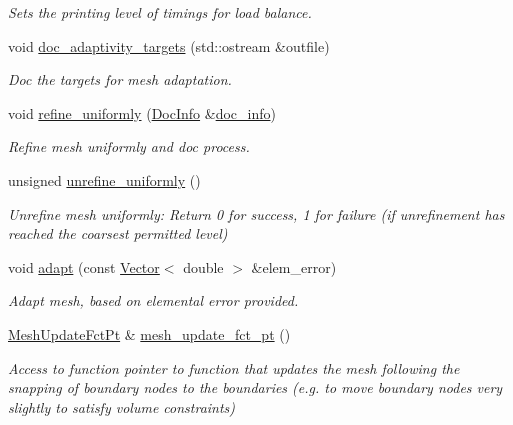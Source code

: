 \begin{DoxyCompactItemize}
\begin{DoxyCompactList}\small\item\em Sets the printing level of timings for load balance. \end{DoxyCompactList}\item 
void \hyperlink{classoomph_1_1RefineableTriangleMesh_a8b04c27cba8938936f73d90e00d70b22}{doc\+\_\+adaptivity\+\_\+targets} (std\+::ostream \&outfile)
\begin{DoxyCompactList}\small\item\em Doc the targets for mesh adaptation. \end{DoxyCompactList}\item 
void \hyperlink{classoomph_1_1RefineableTriangleMesh_a4820744f95d69328dfa4185fff21dd7b}{refine\+\_\+uniformly} (\hyperlink{classoomph_1_1DocInfo}{Doc\+Info} \&\hyperlink{classoomph_1_1RefineableMeshBase_a266f8b2a1499cc2ae7b24b19813923ee}{doc\+\_\+info})
\begin{DoxyCompactList}\small\item\em Refine mesh uniformly and doc process. \end{DoxyCompactList}\item 
unsigned \hyperlink{classoomph_1_1RefineableTriangleMesh_ae52c6aea299625c683522f00a89ff33d}{unrefine\+\_\+uniformly} ()
\begin{DoxyCompactList}\small\item\em Unrefine mesh uniformly\+: Return 0 for success, 1 for failure (if unrefinement has reached the coarsest permitted level) \end{DoxyCompactList}\item 
void \hyperlink{classoomph_1_1RefineableTriangleMesh_affc156d32aa40f84479e223f1217ebed}{adapt} (const \hyperlink{classoomph_1_1Vector}{Vector}$<$ double $>$ \&elem\+\_\+error)
\begin{DoxyCompactList}\small\item\em Adapt mesh, based on elemental error provided. \end{DoxyCompactList}\item 
\hyperlink{classoomph_1_1RefineableTriangleMesh_aa78ffa56b66a1371aec25e25f7aaff9e}{Mesh\+Update\+Fct\+Pt} \& \hyperlink{classoomph_1_1RefineableTriangleMesh_a09e932b9b9b3a42616524dd3fcb35fd3}{mesh\+\_\+update\+\_\+fct\+\_\+pt} ()
\begin{DoxyCompactList}\small\item\em Access to function pointer to function that updates the mesh following the snapping of boundary nodes to the boundaries (e.\+g. to move boundary nodes very slightly to satisfy volume constraints) \end{DoxyCompactList}\item 

\end{DoxyCompactItemize}
